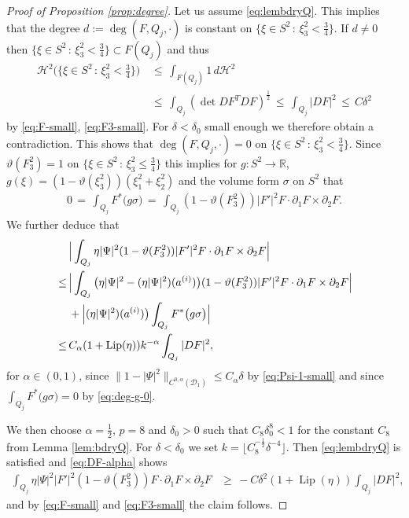 \documentclass[reqno,makeidx,12pt]{amsart}
\theoremstyle{note}
\theoremstyle{definition}
\begin{document}
\begin{proof}[Proof of Proposition \ref{prop:degree}]
Let us assume \eqref{eq:lembdryQ}. This implies that the degree $d:=\deg(F,Q_j,\cdot)$ is constant on $\{\xi\in S^2\,:\, \xi_3^2<\frac{3}{4}\}$. If $d\neq 0$ then $\{\xi\in S^2\,:\,\xi_3^2<\frac{3}{4}\}\subset F(Q_j)$ and thus
\begin{align*}
	{\ensuremath{\mathcal{H}}}^2\big(\{\xi\in S^2\,:\,\xi_3^2< \frac{3}{4}\}\big)\,&\leq\, \int_{F(Q_j)} 1\,d{\ensuremath{\mathcal{H}}}^2\\
	&\leq\, \int_{Q_j} (\det DF^T DF)^\frac{1}{2} \,\leq\, \int_{Q_j} |D F|^2 \,\leq\, C\delta^2
\end{align*}
by \eqref{eq:F-small}, \eqref{eq:F3-small}. For $\delta<\delta_0$ small enough we therefore obtain a contradiction. This shows that $\deg(F,Q_j,\cdot)=0$ on $\{\xi\in S^2\,:\, \xi_3^2<\frac{3}{4}\}$. Since ${\vartheta}(F_3^2)=1$ on $\{\xi\in S^2\,:\, \xi_3^2\leq \frac{3}{4}\}$ this implies for $g:S^2\to{\mathbb R}$, $g(\xi)=(1-{\vartheta}(\xi_3^2))(\xi_1^2+\xi_2^2)$ and the volume form $\sigma$ on $S^2$ 
that
\begin{gather}
	0\,=\, \int_{Q_j} F^*\big(g\sigma\big)\,=\,\int_{Q_j} (1-{\vartheta}(F_3^2)) |F'|^2  F\cdot \partial_1F \times \partial_2F. \label{eq:deg-g-0}
\end{gather}
We further deduce that
\begin{align}
	&\Big|\int_{Q_j} \eta |\Psi|^2 (1-{\vartheta}(F_3^2))  |F'|^2 F\cdot \partial_1F \times \partial_2F\Big| \notag\\
	\,\leq\, &\Big|\int_{Q_j} \big(\eta |\Psi|^2- (\eta|\Psi|^2)(a^{(i)})\big)(1-{\vartheta}(F_3^2))|F'|^2 F\cdot \partial_1F \times \partial_2F \Big|\notag\\
	&+\Big|(\eta|\Psi|^2)(a^{(i)})\big)\int_{Q_j} F^*\big(g\sigma\big)\Big| \notag\\
	\leq\,& {C_\alpha}(1+\operatorname{Lip}(\eta)){k^{-\alpha}}\int_{Q_j} |D F|^2, \label{eq:DF-alpha}
\end{align}
for $\alpha\in (0,1)$, since $\|1-|\Psi|^2\|_{C^{0,\alpha}({\mathcal{D}}_1)}\leq C_\alpha\delta$ by \eqref{eq:Psi-1-small} and since $\int_{Q_j} F^*\big(g\sigma\big)=0$ by  \eqref{eq:deg-g-0}.

We then choose $\alpha=\frac{1}{2}$, $p=8$ and $\delta_0>0$ such that  $C_8\delta_0^8<1$ for the constant $C_8$ from Lemma \ref{lem:bdryQ}.
For $\delta<\delta_0$ we set $k= \lfloor C_8^{-\frac{1}{2}}\delta^{-4} \rfloor$. 
Then \eqref{eq:lembdryQ} is satisfied and \eqref{eq:DF-alpha} shows
\begin{align*}
	\int_{Q_j} \eta |\Psi|^2 |F'|^2 (1-{\vartheta}(F_3^2)) F\cdot \partial_1F \times \partial_2F  &\geq\, -C\delta^2(1+\operatorname{Lip}(\eta))\int_{Q_j} |D F|^2,
\end{align*}
and by \eqref{eq:F-small} and \eqref{eq:F3-small} the claim follows.
\end{proof}
\end{document}
